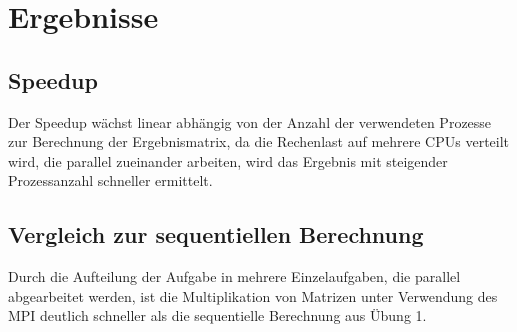 \section{Ergebnisse}

\subsection{Speedup}
Der Speedup wächst linear abhängig von der Anzahl der verwendeten Prozesse zur Berechnung der Ergebnismatrix, da die Rechenlast auf mehrere CPUs verteilt wird, die parallel zueinander arbeiten, wird das Ergebnis mit steigender Prozessanzahl schneller ermittelt. 
\subsection{Vergleich zur sequentiellen Berechnung}
Durch die Aufteilung der Aufgabe in mehrere Einzelaufgaben, die parallel abgearbeitet werden, ist die Multiplikation von Matrizen unter Verwendung des MPI deutlich schneller als die sequentielle Berechnung aus Übung 1.

